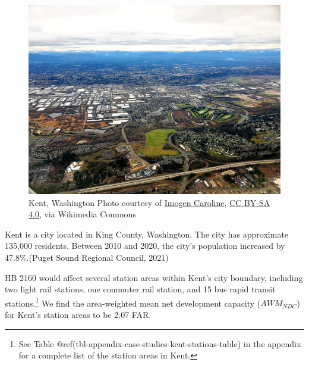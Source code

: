 \documentclass[
]{agujournal2019}
\begin{document}
\begin{figure}[H]

{\centering \includegraphics{images/kent-aerial.jpg}

}

\caption{Kent, Washington \textbar{} Photo courtesy of
\href{https://commons.wikimedia.org/wiki/File:Kent_Washington_Above.jpg}{Imogen
Caroline}, \href{https://creativecommons.org/licenses/by-sa/4.0}{CC
BY-SA 4.0}, via Wikimedia Commons}

\end{figure}%

Kent is a city located in King County, Washington. The city has
approximate 135,000 residents. Between 2010 and 2020, the city's
population increased by 47.8\%.(Puget Sound Regional Council, 2021)

HB 2160 would affect several station areas within Kent's city boundary,
including two light rail stations, one commuter rail station, and 15 bus
rapid transit stations.\footnote{See Table
  @ref(tbl-appendix-case-studies-kent-stations-table) in the appendix
  for a complete list of the station areas in Kent.} We find the
area-weighted mean net development capacity (\(AWM_{NDC}\)) for Kent's
station areas to be 2.07 FAR.
\end{document}
